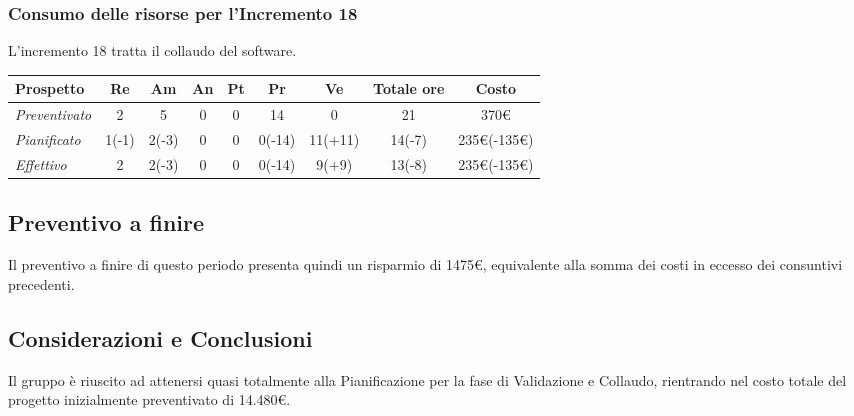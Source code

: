 {{{{{{{{{{{{{{{{{{\subsubsection{Consumo delle risorse per l'Incremento 18}
L'incremento 18 tratta il collaudo del software.
\quad
\def\tabularxcolumn#1{m{#1}}
{

	\begin{center}
		\renewcommand{\arraystretch}{1.4}
		\begin{tabularx}{\textwidth}{|X|c|c|c|c|c|c|c|c|}
			\hline
			\rowcolor{airforceblue}
			\textbf{Prospetto} & \textbf{Re} & \textbf{Am} & \textbf{An} & \textbf{Pt} & \textbf{Pr} & \textbf{Ve} & \textbf{Totale ore} & \textbf{Costo} \\
			\hline
			\textit{Preventivato}& 2 & 5 & 0 & 0 & 14 & 0 & 21 & 370\euro\\
			\hline
			\textit{Pianificato} & 1(-1) & 2(-3) & 0 & 0 & 0(-14) & 11(+11) & 14(-7) & 235\euro(-135\euro) \\
			\hline
			\textit{Effettivo} & 2 & 2(-3) & 0 & 0 & 0(-14) & 9(+9) & 13(-8) & 235\euro(-135\euro) \\
			\hline
		\end{tabularx}
	\end{center}


\subsection{Preventivo a finire}\label{ConsuntivoValidazioneCollaudoPreventivoFinire}
Il preventivo a finire di questo periodo presenta quindi un risparmio di 1475\euro, equivalente alla somma dei costi in eccesso dei consuntivi precedenti.


\subsection{Considerazioni e Conclusioni}

Il gruppo è riuscito ad attenersi quasi totalmente alla Pianificazione per la fase di Validazione e Collaudo, rientrando nel costo totale del progetto inizialmente preventivato di 14.480\euro.


}}}}}}}}}}}}}}}}}}}
